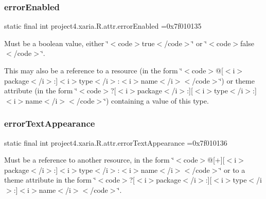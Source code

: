 \subsubsection{\texorpdfstring{error\+Enabled}{errorEnabled}}
{\footnotesize\ttfamily static final int project4.\+xaria.\+R.\+attr.\+error\+Enabled =0x7f010135\hspace{0.3cm}{\ttfamily [static]}}

Must be a boolean value, either \char`\"{}$<$code$>$true$<$/code$>$\char`\"{} or \char`\"{}$<$code$>$false$<$/code$>$\char`\"{}. 

This may also be a reference to a resource (in the form \char`\"{}$<$code$>$@\mbox{[}$<$i$>$package$<$/i$>$\+:\mbox{]}$<$i$>$type$<$/i$>$\+:$<$i$>$name$<$/i$>$$<$/code$>$\char`\"{}) or theme attribute (in the form \char`\"{}$<$code$>$?\mbox{[}$<$i$>$package$<$/i$>$\+:\mbox{]}\mbox{[}$<$i$>$type$<$/i$>$\+:\mbox{]}$<$i$>$name$<$/i$>$$<$/code$>$\char`\"{}) containing a value of this type. \mbox{\label{classproject4_1_1xaria_1_1R_1_1attr_a12b8d454a6d641cd6be5cc768a415661}} 
\subsubsection{\texorpdfstring{error\+Text\+Appearance}{errorTextAppearance}}
{\footnotesize\ttfamily static final int project4.\+xaria.\+R.\+attr.\+error\+Text\+Appearance =0x7f010136\hspace{0.3cm}{\ttfamily [static]}}

Must be a reference to another resource, in the form \char`\"{}$<$code$>$@\mbox{[}+\mbox{]}\mbox{[}$<$i$>$package$<$/i$>$\+:\mbox{]}$<$i$>$type$<$/i$>$\+:$<$i$>$name$<$/i$>$$<$/code$>$\char`\"{} or to a theme attribute in the form \char`\"{}$<$code$>$?\mbox{[}$<$i$>$package$<$/i$>$\+:\mbox{]}\mbox{[}$<$i$>$type$<$/i$>$\+:\mbox{]}$<$i$>$name$<$/i$>$$<$/code$>$\char`\"{}. \mbox{\label{classproject4_1_1xaria_1_1R_1_1attr_a5f39b21c9952ebd1798d6d779181a3c8}} 
